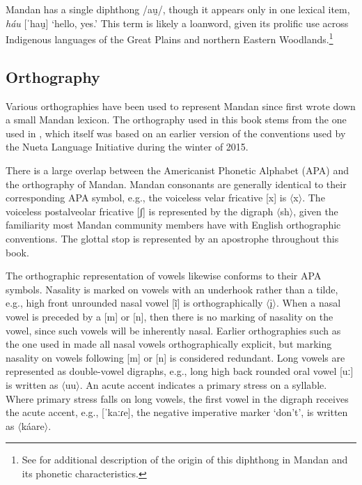 \newpage
Mandan has a single diphthong /au̯/, though it appears only in one lexical item, \textit{háu} [ˈhau̯] `hello, yes.' This term is likely a loanword, given its prolific use across Indigenous languages of the Great Plains and northern Eastern Woodlands.\footnote{See  for additional description of the origin of this diphthong in Mandan and its phonetic characteristics.}

\subsection{Orthography}\label{CHSk1.3}

Various orthographies have been used to represent Mandan since \citet{kipp1852} first wrote down a small Mandan lexicon. The orthography used in this book stems from the one used in \citet{kasak2019}, which itself was based on an earlier version of the conventions used by the Nueta Language Initiative during the winter of 2015.%

There is a large overlap between the Americanist Phonetic Alphabet (APA) and the orthography of Mandan. Mandan consonants are generally identical to their corresponding APA symbol, e.g., the voiceless velar fricative [x] is $\langle$x$\rangle$. The voiceless postalveolar fricative [ʃ] is represented by the digraph $\langle$sh$\rangle$, given the familiarity most Mandan community members have with English orthographic conventions. The glottal stop is represented by an apostrophe throughout this book.

The orthographic representation of vowels likewise conforms to their APA symbols. Nasality is marked on vowels with an underhook rather than a tilde, e.g., high front unrounded nasal vowel [ĩ] is orthographically $\langle$į$\rangle$. When a nasal vowel is preceded by a [m] or [n], then there is no marking of nasality on the vowel, since such vowels will be inherently nasal. Earlier orthographies such as the one used in \citet{hollow1973a,hollow1973b} made all nasal vowels orthographically explicit, but marking nasality on vowels following [m] or [n] is considered redundant. Long vowels are represented as double-vowel digraphs, e.g., long high back rounded oral vowel [uː] is written as $\langle$uu$\rangle$. An acute accent indicates a primary stress on a syllable. Where primary stress falls on long vowels, the first vowel in the digraph receives the acute accent, e.g., [ˈkaːɾe], the negative imperative marker `don't', is written as $\langle${káare}$\rangle$.

